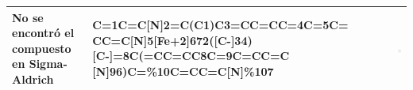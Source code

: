\begin{landscape}
\begin{longtable}{m{7cm}m{8cm}m{2.3cm}m{2.3cm}}
 No se encontró el compuesto en Sigma-Aldrich & 
 C=1C=C[N]2=C(C1)C3=CC=CC=4C=5C= CC=C[N]5[Fe+2]672([C-]34)[C-]=8C(=CC=CC8C=9C=CC=C [N]96)C=\%10C=CC=C[N]\%107 & 
 & 
 \includegraphics[width=2.2cm]{imagenes/sciFinder/pdf/(OC-6-11)-Bis[2,6-di(2-pyridinyl-ÎºN)phenyl-ÎºC]iron.pdf} \\
\hline



\end{longtable}

\end{landscape}


